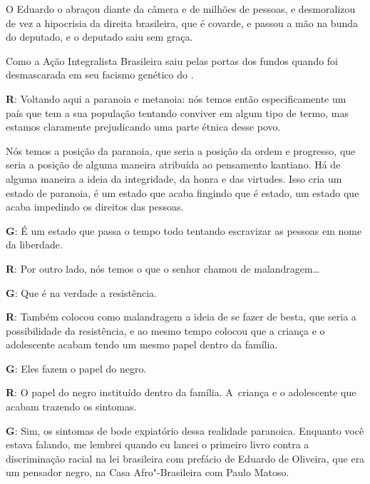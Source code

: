  

O Eduardo o abraçou diante da câmera e de milhões de pessoas, e
desmoralizou de vez a hipocrisia da direita brasileira, que é covarde, e
passou a mão na bunda do deputado, e o deputado saiu sem graça.

 

Como a Ação Integralista Brasileira saiu pelas portas dos fundos quando
foi desmascarada em seu facismo genético do .

 

\textbf{R}: Voltando aqui a paranoia e metanoia: nós temos então
especificamente um país que tem a sua população tentando conviver em
algum tipo de termo, mas estamos claramente prejudicando uma parte
étnica desse povo.

 

Nós temos a posição da paranoia, que seria a posição da ordem e
progresso, que seria a posição de alguma maneira atribuída ao pensamento
kantiano. Há de alguma maneira a ideia da integridade, da honra e das
virtudes. Isso cria um estado de paranoia, é um estado que acaba
fingindo que é estado, um estado que acaba impedindo os direitos das
pessoas.

 

\textbf{G}: É um estado que passa o tempo todo tentando escravizar as
pessoas em nome da liberdade.

 

\textbf{R}: Por outro lado, nós temos o que o senhor chamou de
malandragem…

 

\textbf{G}: Que é na verdade a resistência.

 

\textbf{R}: Também colocou como malandragem a ideia de se fazer de
besta, que seria a possibilidade da resistência, e ao mesmo tempo
colocou que a criança e o adolescente acabam tendo um mesmo papel dentro
da família.

 

\textbf{G}: Eles fazem o papel do negro.

 

\textbf{R}: O papel do negro instituído dentro da família. A~criança e o
adolescente que acabam trazendo os sintomas.

 

\textbf{G}: Sim, os sintomas de bode expiatório dessa realidade
paranoica. Enquanto você estava falando, me lembrei quando eu lancei o
primeiro livro contra a discriminação racial na lei brasileira com
prefácio de Eduardo de Oliveira, que era um pensador negro, na Casa
Afro"-Brasileira com Paulo Matoso.

